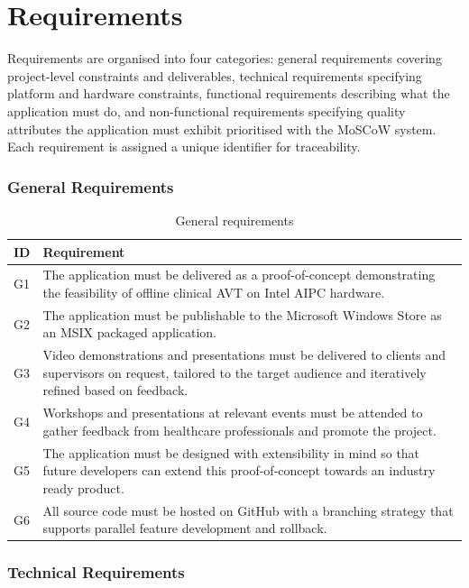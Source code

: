\chapter{Requirements}
\label{app:requirements}
Requirements are organised into four categories: general requirements covering project-level constraints and deliverables, technical requirements specifying platform and hardware constraints, functional requirements describing what the application must do, and non-functional requirements specifying quality attributes the application must exhibit prioritised with the MoSCoW system. Each requirement is assigned a unique identifier for traceability.

\subsection{General Requirements}
\label{app:greq}
\begin{table}[H]
\centering
\begin{tabularx}{\textwidth}{l X}
\toprule
\textbf{ID} & \textbf{Requirement} \\
\midrule
G1 & The application must be delivered as a proof-of-concept demonstrating the feasibility of offline clinical AVT on Intel AIPC hardware. \\
G2 & The application must be publishable to the Microsoft Windows Store as an MSIX packaged application. \\
G3 & Video demonstrations and presentations must be delivered to clients and supervisors on request, tailored to the target audience and iteratively refined based on feedback. \\
G4 & Workshops and presentations at relevant events must be attended to gather feedback from healthcare professionals and promote the project. \\
G5 & The application must be designed with extensibility in mind so that future developers can extend this proof-of-concept towards an industry ready product. \\
G6 & All source code must be hosted on GitHub with a branching strategy that supports parallel feature development and rollback. \\
\bottomrule
\end{tabularx}
\caption{General requirements}
\label{tab:greq}
\end{table}

\subsection{Technical Requirements}
\label{app:treq}

